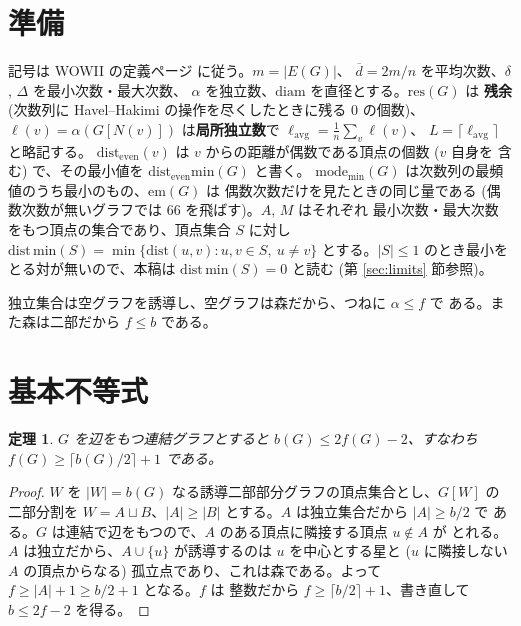 \documentclass[paper=a4,fontsize=10.5pt,jafontsize=10.5pt]{jlreq}
\theoremstyle{plain}
\newtheorem{theorem}{定理}[section]
\theoremstyle{definition}
\begin{document}
\section{準備}\label{sec:prelim}

記号は WOWII の定義ページ \cite{wowii} に従う。$m = |E(G)|$、
$\overline{d} = 2m/n$ を平均次数、$\delta$, $\Delta$ を最小次数・最大次数、
$\alpha$ を独立数、$\mathrm{diam}$ を直径とする。$\mathrm{res}(G)$ は
\textbf{残余} (次数列に Havel--Hakimi の操作を尽くしたときに残る $0$ の個数)、
$\ell(v) = \alpha(G[N(v)])$ は\textbf{局所独立数}で
$\ell_{\mathrm{avg}} = \frac{1}{n}\sum_{v} \ell(v)$、
$L = \lceil \ell_{\mathrm{avg}} \rceil$ と略記する。
$\mathrm{dist_{even}}(v)$ は $v$ からの距離が偶数である頂点の個数 ($v$ 自身を
含む) で、その最小値を $\mathrm{dist_{even}min}(G)$ と書く。
$\mathrm{mode_{min}}(G)$ は次数列の最頻値のうち最小のもの、$\mathrm{em}(G)$ は
偶数次数だけを見たときの同じ量である (偶数次数が無いグラフでは 66 を飛ばす)。$A$, $M$ はそれぞれ
最小次数・最大次数をもつ頂点の集合であり、頂点集合 $S$ に対し
$\mathrm{dist\,min}(S) = \min\{\mathrm{dist}(u,v) : u, v \in S,\ u \ne v\}$
とする。$|S| \le 1$ のとき最小をとる対が無いので、本稿は
$\mathrm{dist\,min}(S) = 0$ と読む (第 \ref{sec:limits} 節参照)。

独立集合は空グラフを誘導し、空グラフは森だから、つねに $\alpha \le f$ で
ある。また森は二部だから $f \le b$ である。

\section{基本不等式}\label{sec:basic}

\begin{theorem}\label{thm:b2f}
$G$ を辺をもつ連結グラフとすると $b(G) \le 2f(G) - 2$、すなわち
$f(G) \ge \lceil b(G)/2 \rceil + 1$ である。
\end{theorem}

\begin{proof}
$W$ を $|W| = b(G)$ なる誘導二部部分グラフの頂点集合とし、$G[W]$ の二部分割を
$W = A \sqcup B$、$|A| \ge |B|$ とする。$A$ は独立集合だから $|A| \ge b/2$ で
ある。$G$ は連結で辺をもつので、$A$ のある頂点に隣接する頂点 $u \notin A$ が
とれる。$A$ は独立だから、$A \cup \{u\}$ が誘導するのは $u$ を中心とする星と
($u$ に隣接しない $A$ の頂点からなる) 孤立点であり、これは森である。よって $f \ge |A| + 1 \ge b/2 + 1$ となる。$f$ は
整数だから $f \ge \lceil b/2 \rceil + 1$、書き直して $b \le 2f - 2$ を得る。
\end{proof}
\end{document}
